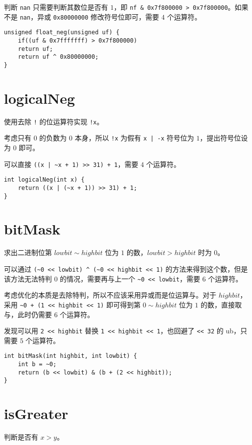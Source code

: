 \documentclass{noithesis}
\begin{document}
	判断 \verb|nan| 只需要判断其数位是否有 $1$，即 \verb|nf & 0x7f800000 > 0x7f800000|。如果不是 \verb|nan|，异或 \verb|0x80000000| 修改符号位即可，需要 $4$ 个运算符。
	
\begin{lstlisting}
unsigned float_neg(unsigned uf) {
	if((uf & 0x7fffffff) > 0x7f800000)
	return uf;
	return uf ^ 0x80000000;
}
\end{lstlisting}
	
	\section{logicalNeg}
	
	使用去除 \verb|!| 的位运算符实现 \verb|!x|。
	
	考虑只有 $0$ 的负数为 $0$ 本身，所以 \verb|!x| 为假有 \verb!x | -x! 符号位为 $1$，提出符号位设为 $0$ 即可。
	
	可以直接 \verb!((x | ~x + 1) >> 31) + 1!，需要 $4$ 个运算符。
\begin{lstlisting}
int logicalNeg(int x) {
	return ((x | (~x + 1)) >> 31) + 1;
}
\end{lstlisting}

	\section{bitMask}
	
	求出二进制位第 $lowbit \sim highbit$ 位为 $1$ 的数，$lowbit> highbit$ 时为 $0$。
	
	可以通过 \verb|(~0 << lowbit) ^ (~0 << highbit << 1)| 的方法来得到这个数，但是该方法无法特判 $0$ 的情况，需要再与上一个 \verb|~0 << lowbit|，需要 $6$ 个运算符。
	
	考虑优化的本质是去除特判，所以不应该采用异或而是位运算与。对于 $highbit$，采用 \verb|~0 + (1 << highbit << 1)| 即可得到第 $0\sim highbit$ 位为 $1$ 的数，直接取与，此时仍需要 $6$ 个运算符。
	
	发现可以用 \verb|2 << highbit| 替换 \verb|1 << highbit << 1|，也回避了 \verb|<< 32| 的 ub，只需要 $5$ 个运算符。
\begin{lstlisting}
int bitMask(int highbit, int lowbit) {
	int b = ~0;
	return (b << lowbit) & (b + (2 << highbit));
}
\end{lstlisting}
	
	\section{isGreater}
	
	判断是否有 $x>y$。
	
\end{document}
